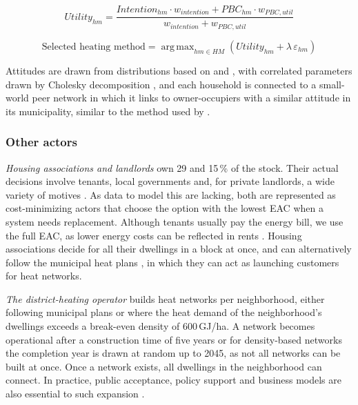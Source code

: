 \documentclass[preprint,12pt,authoryear]{elsarticle}
\DeclareMathOperator*{\argmax}{arg\,max}
\begin{document}
\begin{equation}\label{eq:utility}
  Utility_{hm} = \frac{Intention_{hm}\cdot w_{intention}
    + PBC_{hm}\cdot w_{PBC, util}}
    {w_{intention} + w_{PBC, util}}
\end{equation}

\begin{equation}\label{eq:argmax}
  \text{Selected heating method} = \argmax_{hm \in HM} \left( Utility_{hm} +
  \lambda\,\varepsilon_{hm} \right)
\end{equation}

Attitudes are drawn from distributions
based on \citet{okurAdoptionRenewableHeating2024} and
\citet{broersDecidedDividedEmpirical2019}, with correlated parameters drawn
by Cholesky decomposition \citep{edlinCorrelatedParametersCholesky2015}, and
each household is connected to a small-world peer network in which it links
to owner-occupiers with a similar attitude in its municipality, similar
to the method used by \citet{loomansQuantifyingPotentialEnergy2026}.

\subsubsection{Other actors}

\emph{Housing associations and landlords} own 29 and 15\,\% of the
stock. Their actual decisions involve tenants, local governments and, for
private landlords, a wide variety of motives
\citep{filippidouAreWeMoving2017,hoppeAdoptionInnovativeEnergy2012,
lennartzParticuliereVerhuurdersOp2019,
marzEconomicsUnderstandingDecisionmaking2018}. As data to model this are
lacking, both are represented as cost-minimizing actors that choose the
option with the lowest EAC when a system needs replacement. Although tenants
usually pay the energy bill, we use the full EAC, as lower energy costs
can be reflected in rents
\citep{chegutEnergyEfficiencyEconomic2016}. Housing associations decide for
all their dwellings in a block at once, and can alternatively follow the
municipal heat plans \citep{molenOverzichtTransitievisiesWarmte2023}, in
which they can act as launching customers for heat networks.

\emph{The district-heating operator} builds heat networks per
neighborhood, either following municipal plans or where the heat demand of
the neighborhood's dwellings exceeds a break-even density of 600\,GJ/ha. A
network becomes operational after a construction time of five years or for
density-based networks the completion year is drawn at random up to 2045, as
not all networks can be built at once.  
Once a network exists, all dwellings in the neighborhood can
connect. In practice, public acceptance, policy
support and business models are also essential to such expansion
\citep{bertelsenImplementingLargescaleHeating2021,
saliteAssessingAdoptionSustainable2024}.
\end{document}
